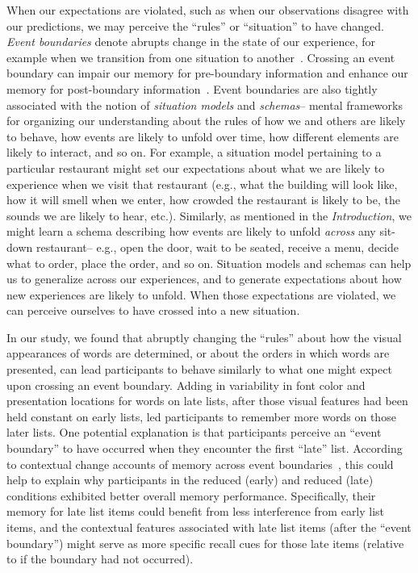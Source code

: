 \documentclass[11pt]{article}
\begin{document}
When our expectations are violated, such as when our observations disagree with
our predictions, we may perceive the ``rules'' or ``situation'' to have
changed. \textit{Event boundaries} denote abrupts change in the state of our
experience, for example when we transition from one situation to
another~\citep{RadvZack17, ZwaaRadv98}. Crossing an event boundary can impair
our memory for pre-boundary information and enhance our memory for
post-boundary information~\citep{RadvCope06, SahaKell02, MannEtal16}. Event
boundaries are also tightly associated with the notion of \textit{situation
models} and \textit{schemas}-- mental frameworks for organizing our
understanding about the rules of how we and others are likely to behave, how
events are likely to unfold over time, how different elements are likely to
interact, and so on. For example, a situation model pertaining to a particular
restaurant might set our expectations about what we are likely to experience
when we visit that restaurant (e.g., what the building will look like, how it
will smell when we enter, how crowded the restaurant is likely to be, the
sounds we are likely to hear, etc.). Similarly, as mentioned in the
\textit{Introduction}, we might learn a schema describing how events are likely
to unfold \textit{across} any sit-down restaurant-- e.g., open the door, wait
to be seated, receive a menu, decide what to order, place the order, and so on.
Situation models and schemas can help us to generalize across our experiences,
and to generate expectations about how new experiences are likely to unfold.
When those expectations are violated, we can perceive ourselves to have crossed
into a new situation.

In our study, we found that abruptly changing the ``rules'' about how the
visual appearances of words are determined, or about the orders in which words
are presented, can lead participants to behave similarly to what one might
expect upon crossing an event boundary. Adding in variability in font color and
presentation locations for words on late lists, after those visual features had
been held constant on early lists, led participants to remember more words on
those later lists. One potential explanation is that participants perceive an
``event boundary'' to have occurred when they encounter the first ``late''
list. According to contextual change accounts of memory across event
boundaries~\citep[e.g.,][]{SahaKell02}, this could help to explain why
participants in the reduced (early) and reduced (late) conditions exhibited
better overall memory performance. Specifically, their memory for late list
items could benefit from less interference from early list items, and the
contextual features associated with late list items (after the ``event
boundary'') might serve as more specific recall cues for those late items
(relative to if the boundary had not occurred).
\end{document}
